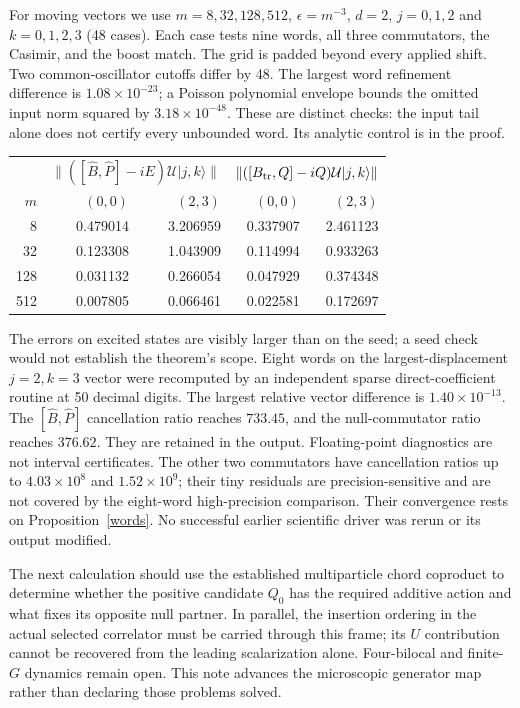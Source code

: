 \documentclass[11pt]{article}
\newcommand{\eps}{\epsilon}
\newcommand{\ket}[1]{|#1\rangle}
\newcommand{\B}{\widehat B}
\newcommand{\PP}{\widehat P}
\newcommand{\Bt}{B_{\rm tr}}
\newcommand{\U}{\mathcal U}
\begin{document}
For moving vectors we use $m=8,32,128,512$, $\eps=m^{-3}$,
$d=2$, $j=0,1,2$ and $k=0,1,2,3$ (48 cases).
Each case tests nine words, all three commutators, the Casimir,
and the boost match. The grid is padded beyond every applied
shift. Two common-oscillator cutoffs differ by 48.
The largest word refinement difference is $1.08\times10^{-23}$;
a Poisson polynomial envelope bounds the omitted input norm
squared by $3.18\times10^{-48}$.
These are distinct checks: the input tail alone does not certify
every unbounded word. Its analytic control is in the proof.

\begin{center}
\begin{tabular}{rrrrr}
\toprule
 & \multicolumn{2}{c}{$\|([\B,\PP]-iE)\U\ket{j,k}\|$}
 & \multicolumn{2}{c}{$\|([\Bt,Q]-iQ)\U\ket{j,k}\|$}\\
$m$ & $(0,0)$ & $(2,3)$ & $(0,0)$ & $(2,3)$\\
\midrule
8 & 0.479014 & 3.206959 & 0.337907 & 2.461123\\
32 & 0.123308 & 1.043909 & 0.114994 & 0.933263\\
128 & 0.031132 & 0.266054 & 0.047929 & 0.374348\\
512 & 0.007805 & 0.066461 & 0.022581 & 0.172697\\
\bottomrule
\end{tabular}
\end{center}
The errors on excited states are visibly larger than on the
seed; a seed check would not establish the theorem's scope.
Eight words on the largest-displacement $j=2,k=3$ vector were
recomputed by an independent sparse direct-coefficient routine
at 50 decimal digits. The largest relative vector difference is
$1.40\times10^{-13}$. The $[\B,\PP]$ cancellation ratio reaches
$733.45$, and the null-commutator ratio reaches $376.62$.
They are retained in the output. Floating-point diagnostics are
not interval certificates. The other two commutators have
cancellation ratios up to $4.03\times10^8$ and $1.52\times10^9$;
their tiny residuals are precision-sensitive and are not covered
by the eight-word high-precision comparison. Their convergence
rests on Proposition~\ref{words}. No successful earlier scientific
driver was rerun or its output modified.

The next calculation should use the established multiparticle
chord coproduct to determine whether the positive candidate
$Q_0$ has the required additive action and what fixes its
opposite null partner. In parallel, the insertion ordering in
the actual selected correlator must be carried through this
frame; its $U$ contribution cannot be recovered from the leading
scalarization alone. Four-bilocal and finite-$G$ dynamics remain
open. This note advances the microscopic generator map rather
than declaring those problems solved.
\end{document}
